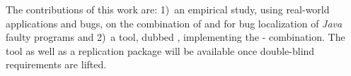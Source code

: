 \documentclass{article}
\begin{document}
The contributions of this work are: 1)~an empirical study, using
real-world applications and bugs, on the combination of \ds{} and
\sfl{} for bug localization of \emph{Java} faulty programs and 2)~a
tool, dubbed \comb{}, implementing the \ds{}-\sfl{} combination. The
tool as well as a replication package will be available once
double-blind requirements are lifted.







\end{document}
